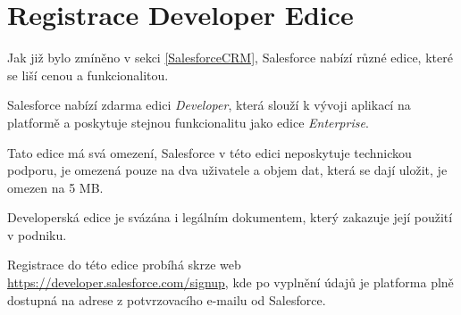 \section{Registrace Developer Edice}\label{sec:RegistraceDeveloperEdice}
Jak již bylo zmíněno v sekci \ref{SalesforceCRM}, Salesforce nabízí různé edice, které se liší cenou a funkcionalitou.  

Salesforce nabízí zdarma edici \emph{Developer}, která slouží k vývoji aplikací na platformě a poskytuje stejnou funkcionalitu jako edice \emph{Enterprise}. 

Tato edice má svá omezení, Salesforce v této edici neposkytuje technickou podporu, je omezená pouze na dva uživatele a objem dat, která se dají uložit, je omezen na 5 MB. \cite{SalesforceEditions}\cite{SalesforceEditionFeaturesAndAllocations}

Developerská edice je svázána i legálním dokumentem, který zakazuje její použití v podniku. \cite{SalesforceDeveloperEditionMSA}

Registrace do této edice probíhá skrze web \url{https://developer.salesforce.com/signup}, kde po vyplnění údajů je platforma plně dostupná na adrese z potvrzovacího e-mailu od Salesforce. 
